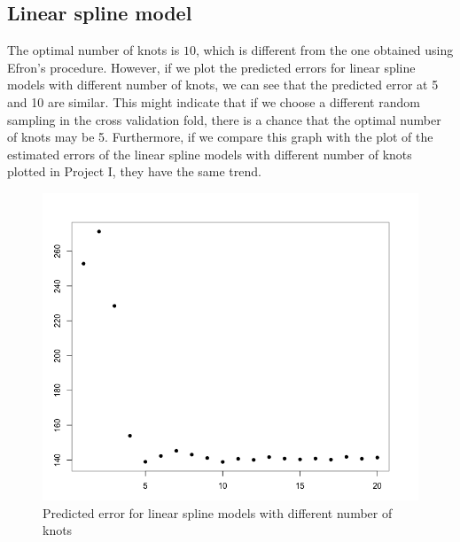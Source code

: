\documentclass[12pt]{article}
\begin{document}
\subsection{Linear spline model}
\begin{Schunk}
\end{Schunk}
The optimal number of knots is $10$, which is different from the one obtained using Efron's procedure. However, if we plot the predicted errors for linear spline models with different number of knots, we can see that the predicted error at 5 and 10 are similar. This might indicate that if we choose a different random sampling in the cross validation fold, there is a chance that the optimal number of knots may be 5. Furthermore, if we compare this graph with the plot of the estimated errors of the linear spline models with different number of knots plotted in Project I, they have the same trend.
\begin{figure}
\begin{center}
\caption{Predicted error for linear spline models with different number of knots}
\includegraphics[scale=0.50]{linear spline find the optimal knot}
\end{center}
\end{figure}
\end{document}

